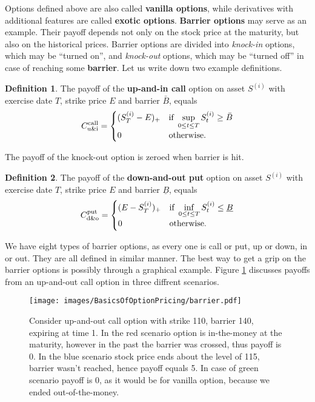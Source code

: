 \documentclass[a4paper,11pt, twoside]{book}
\theoremstyle{definition}
\newtheorem{mydef}{Definition}[chapter]
\theoremstyle{remark}
\begin{document}
Options defined above are also called \textbf{vanilla options}, while derivatives with additional features are called \textbf{exotic options}. \textbf{Barrier options} may serve as an example. Their payoff depends not only on the stock price at the maturity, but also on the historical prices. Barrier options are divided into \textit{knock-in} options, which may be ``turned on'', and \textit{knock-out} options, which may be ``turned off'' in case of reaching some \textbf{barrier}. Let us write down two example definitions.
\begin{mydef}
The payoff of the \textbf{up-and-in call} option on asset $S^{(i)}$ with exercise date $T$, strike price $E$ and barrier $\bar{B}$, equals
\[ C^{\hbox{\scriptsize call}}_{\hbox{\scriptsize u\&i}} = 
\begin{cases}
 (S^{(i)}_T - E)_+    & \hbox{if } \sup\limits_{0 \leq t \leq T} S^{(i)}_t \geq \bar{B}\\
 0                    & \hbox{otherwise.}
\end{cases}
\]
\end{mydef}
\noindent The payoff of the knock-out option is zeroed when barrier is hit.
\begin{mydef}
The payoff of the \textbf{down-and-out put} option on asset $S^{(i)}$ with exercise date $T$, strike price $E$ and barrier $\underline{B}$, equals
\[ C^{\hbox{\scriptsize put}}_{\hbox{\scriptsize d\&o}} = 
\begin{cases}
 (E - S^{(i)}_T)_+    & \hbox{if } \inf\limits_{0 \leq t \leq T} S^{(i)}_t \leq \underline{B}\\
 0                    & \hbox{otherwise.}
\end{cases}
\]
\end{mydef}
We have eight types of barrier options, as every one is call or put, up or down, in or out. They are all defined in similar manner. The best way to get a grip on the barrier options is possibly through a graphical example. Figure \ref{fig:barrier} discusses payoffs from an up-and-out call option in three diffrent scenarios. 
\begin{figure}[!ht]
\centering
 \texttt{[image: images/BasicsOfOptionPricing/barrier.pdf]}
\caption{Consider up-and-out call option with strike 110, barrier 140, expiring at time 1. In the red scenario option is in-the-money at the maturity, however in the past the barrier was crossed, thus payoff is 0. In the blue scenario stock price ends about the level of 115, barrier wasn't reached, hence payoff equals 5. In case of green scenario payoff is 0, as it would be for vanilla option, because we ended out-of-the-money. }
\label{fig:barrier}
\end{figure}
\end{document}
